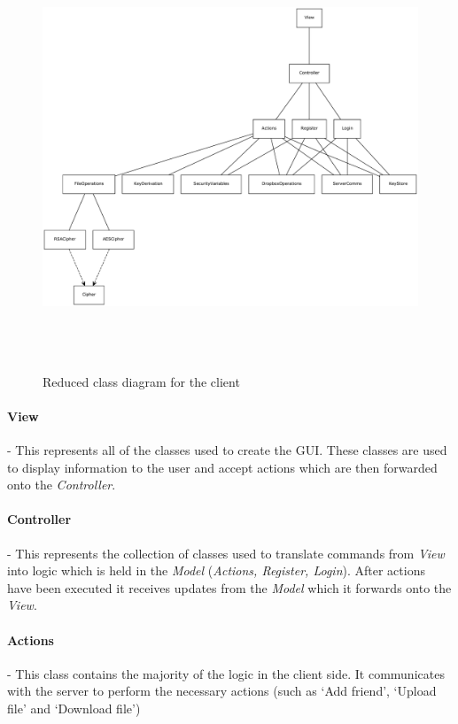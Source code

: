 \documentclass[12pt, titlepage]{article}
\begin{document}
\begin{figure}
\centerline{\includegraphics[height=5.0in,width=8in,angle=0]{client-classDiagram.pdf}}
\caption{Reduced class diagram for the client}
\label{fig:reducedClientClass}
\end{figure}

\paragraph*{View} - This represents all of the classes used to create the GUI. These classes are used to display information to the user and accept actions which are then forwarded onto the \textit{Controller}.
\paragraph*{Controller} - This represents the collection of classes used to translate commands from \textit{View} into logic which is held in the \textit{Model} (\textit{Actions, Register, Login}). After actions have been executed it receives updates from the \textit{Model} which it forwards onto the \textit{View}.
\paragraph*{Actions} - This class contains the majority of the logic in the client side. It communicates with the server to perform the necessary actions (such as `Add friend', `Upload file' and `Download file')
\end{document}
